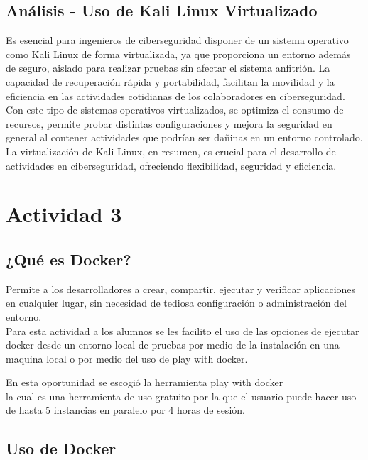 \documentclass[stu, 11pt, letterpaper, donotrepeattitle, floatsintext, natbib]{apa7}
\begin{document}
\subsection{Análisis - Uso de Kali Linux Virtualizado}

Es esencial para ingenieros de ciberseguridad disponer de un sistema operativo como Kali Linux de forma virtualizada, ya que proporciona un entorno además de seguro, aislado para realizar pruebas sin afectar el sistema anfitrión. La capacidad de recuperación rápida y portabilidad, facilitan la movilidad y la eficiencia en las actividades cotidianas de los colaboradores en ciberseguridad. Con este tipo de sistemas operativos virtualizados, se optimiza el consumo de recursos, permite probar distintas configuraciones y mejora la seguridad en general al contener actividades que podrían ser dañinas en un entorno controlado. La virtualización de Kali Linux, en resumen, es crucial para el desarrollo de actividades en ciberseguridad, ofreciendo flexibilidad, seguridad y eficiencia.
 


\newpage

\section{\large Actividad 3}

\subsection{¿Qué es Docker?} 
Permite a los desarrolladores a crear, compartir, ejecutar y verificar aplicaciones en cualquier lugar, sin necesidad de tediosa configuración o administración del entorno. 
\noindent {}\\

Para esta actividad a los alumnos se les facilito el uso de las opciones de ejecutar docker desde un entorno local de pruebas por medio de la instalación en una maquina local o por medio del uso de play with docker.

En esta oportunidad se escogió la herramienta play with docker \noindent{}\\ la cual es una herramienta de uso gratuito por la que el usuario puede hacer uso de hasta 5 instancias en paralelo por 4 horas de sesión.

\subsection{Uso de Docker} 
\end{document}
